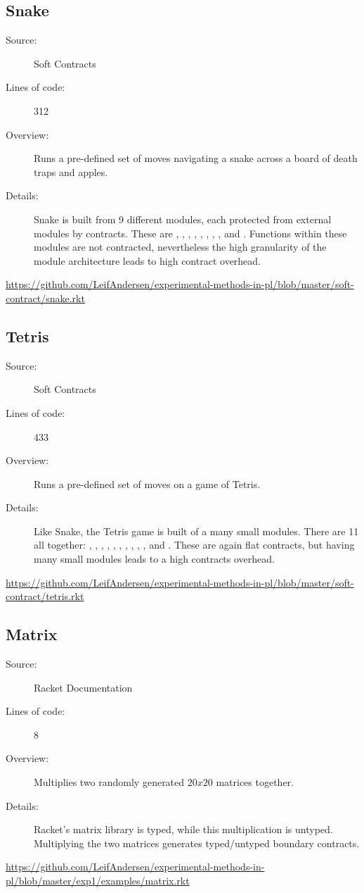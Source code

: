\subsection*{Snake~\hrulefill}
\begin{description}
\item[Source:] Soft Contracts
\item[Lines of code:] 312
\item[Overview:]
  Runs a pre-defined set of moves navigating a snake across a board of death traps and apples.
\item[Details:] 
  Snake is built from 9 different modules, each protected from external modules by contracts.
  These are , , , , , , , , and .
  Functions within these modules are not contracted, nevertheless the high granularity of the module architecture leads to high contract overhead.
\end{description}
\url{https://github.com/LeifAndersen/experimental-methods-in-pl/blob/master/soft-contract/snake.rkt}

\subsection*{Tetris~\hrulefill}
\begin{description}
\item[Source:] Soft Contracts
\item[Lines of code:] 433
\item[Overview:]
  Runs a pre-defined set of moves on a game of Tetris.
\item[Details:] 
  Like Snake, the Tetris game is built of a many small modules.
  There are 11 all together: , , , , , , , , , , and .
  These are again flat contracts, but having many small modules leads to a high contracts overhead.
\end{description}
\url{https://github.com/LeifAndersen/experimental-methods-in-pl/blob/master/soft-contract/tetris.rkt}

\subsection*{Matrix~\hrulefill}
\begin{description}
\item[Source:] Racket Documentation
\item[Lines of code:] 8
\item[Overview:]
  Multiplies two randomly generated $20x20$ matrices together.
\item[Details:]
  Racket's matrix library is typed, while this multiplication is untyped.
  Multiplying the two matrices generates typed/untyped boundary contracts.
\end{description}
\url{https://github.com/LeifAndersen/experimental-methods-in-pl/blob/master/exp1/examples/matrix.rkt}

